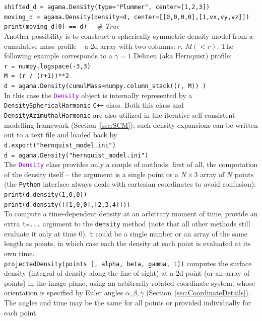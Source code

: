 \documentclass[12pt]{article}
\newcommand{\Cpp}  {\texttt{C++}\xspace}
\newcommand{\Python}{\texttt{Python}\xspace}
\newcommand{\ttt}[1]{\textcolor{darkviolet}{\texttt{#1}}}
\newcommand{\ppp}[1]{\textcolor{darkolive} {\texttt{#1}}}
\begin{document}
\texttt{shifted_d = agama.Density(type="Plummer", center=[1,2,3])\\
moving_d = agama.Density(density=d, center=[[0,0,0,0],[1,vx,vy,vz]])\\
print(moving_d[0] == d)}\textit{\color{Sepia} \ \ \# True}\\[2mm]
Another possibility is to construct a spherically-symmetric density model from a cumulative mass profile -- a 2d array with two columns: $r$, $M(<r)$. The following example corresponds to a $\gamma=1$ Dehnen (aka Hernquist) profile:\\
\texttt{r = numpy.logspace(-3,3)}\\
\texttt{M = (r / (r+1))**2}\\
\texttt{d = agama.Density(cumulMass=numpy.column_stack((r, M)) )}\\[2mm]
In this case the \ttt{Density} object is internally represented by a \ppp{DensitySphericalHarmonic} \Cpp class. Both this class and \ppp{DensityAzimuthalHarmonic} are also utilized in the iterative self-consistent modelling framework (Section~\ref{sec:SCM}); such density expansions can be written out to a text file and loaded back by\\
\texttt{d.export("hernquist_model.ini")}\\
\texttt{d = agama.Density("hernquist_model.ini")}\\[2mm]
The \ttt{Density} class provides only a couple of methods: first of all, the computation of the density itself -- the argument is a single point or a $N\times3$ array of $N$ points (the \Python interface always deals with cartesian coordinates to avoid confusion):\\
\texttt{print(d.density(1,0,0))}\\
\texttt{print(d.density([[1,0,0],[2,3,4]]))}\\
To compute a time-dependent density at an arbitrary moment of time, provide an extra \texttt{t=...} argument to the \texttt{density} method (note that all other methods still evaluate it only at time 0). \texttt{t} could be a single number or an array of the same length as points, in which case each the density at each point is evaluated at its own time.\\[2mm]
\texttt{projectedDensity(points [, alpha, beta, gamma, t])} computes the surface density (integral of density along the line of sight) at a 2d point (or an array of points) in the image plane, using an arbitrarily rotated coordinate system, whose orientation is specified by Euler angles $\alpha, \beta, \gamma$ (Section~\ref{sec:CoordinateDetails}). The angles and time may be the same for all points or provided individually for each point.\\[2mm]
\end{document}
